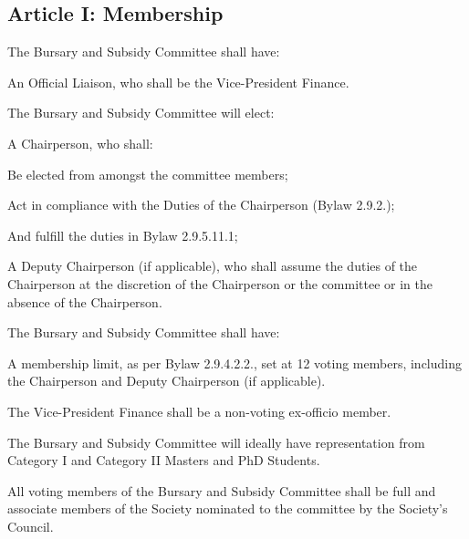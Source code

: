 \subsection{Article I: Membership}
\begin{longenum}[ label*=\thesubsection.\arabic*., align=left] 
	\item The Bursary and Subsidy Committee shall have:
		\begin{longenum}[ label*=\arabic*., align=left] 
		\item An Official Liaison, who shall be the Vice-President Finance.
		\end{longenum}
	\item The Bursary and Subsidy Committee will elect:
		\begin{longenum}[ label*=\arabic*., align=left]
		\item A Chairperson, who shall:
			\begin{longenum}[ label*=\arabic*., align=left]
			\item Be elected from amongst the committee members;
			\item Act in compliance with the Duties of the Chairperson (Bylaw 2.9.2.);
			\item And fulfill the duties in Bylaw 2.9.5.11.1;
			\item A Deputy Chairperson (if applicable), who shall assume the duties of the Chairperson at the discretion of the Chairperson or the committee or in the absence of the Chairperson.
			\end{longenum}
		\end{longenum}
\item The Bursary and Subsidy Committee shall have:
	\begin{longenum}[ label*=\arabic*., align=left]
	\item A membership limit, as per Bylaw 2.9.4.2.2., set at 12 voting members, including the Chairperson and Deputy Chairperson (if applicable).
	\end{longenum}
	\item The Vice-President Finance shall be a non-voting ex-officio member.
	\item The Bursary and Subsidy Committee will ideally have representation from Category I and Category II Masters and PhD Students.
	\item All voting members of the Bursary and Subsidy Committee shall be full and associate members of the Society nominated to the committee by the Society’s Council.     
\end{longenum}

